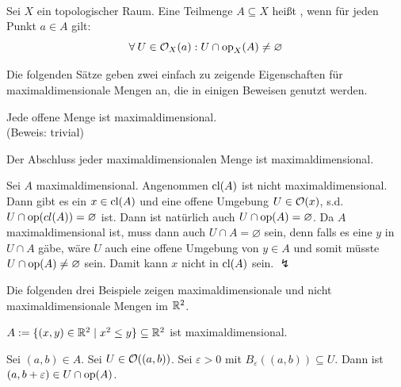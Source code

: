     \begin{dfn}[Maximaldimensional]\label{def:maxdim}\ \\
        Sei $X$ ein topologischer Raum. Eine Teilmenge $A \subseteq X$ heißt , wenn für jeden Punkt $a \in A$ gilt:
        $$\forall\: U \in \mathcal{O}_X(a) : U \cap \text{op}_X(A) \neq \varnothing$$ 
    \end{dfn}
    
    
    Die folgenden Sätze geben zwei einfach zu zeigende Eigenschaften für maximaldimensionale Mengen an, die in einigen Beweisen genutzt werden.
    \begin{satz}\label{satz:offen-maxdim}
        Jede offene Menge ist maximaldimensional.\\
        (Beweis: trivial)
    \end{satz}
    
    
    \begin{satz}\label{satz:abschluss-maxdim}
        Der Abschluss jeder maximaldimensionalen Menge ist maximaldimensional.
    \end{satz}
    
    \begin{bew}
        Sei $A$ maximaldimensional. 
        Angenommen $\text{cl}(A)$ ist nicht maximaldimensional.
        Dann gibt es ein $x \in \text{cl}(A)$ und eine offene Umgebung $U \in \mathcal{O}(x)$, s.d. $U \cap \text{op}(cl(A)) = \varnothing$ ist.
        Dann ist natürlich auch $U \cap \text{op}(A) = \varnothing$.
        Da $A$ maximaldimensional ist, muss dann auch $U \cap A = \varnothing$ sein, denn falls es eine $y$ in $U \cap A$ gäbe, wäre $U$ auch eine offene Umgebung von $y \in A$ und somit müsste $U \cap \text{op}(A) \neq \varnothing$ sein.
        Damit kann $x$ nicht in $\text{cl}(A)$ sein. 
        $\lightning$
    \end{bew}


    Die folgenden drei Beispiele zeigen maximaldimensionale und nicht maximaldimensionale Mengen im $\mathbb{R}^2$.
    \begin{bsp}\label{bsp:maximaldimensional-1}
        $A := \{(x,y) \in \mathbb{R}^2 \mid x^2 \leq y\} \subseteq \mathbb{R}^2$ ist maximaldimensional.
    \end{bsp}
    \begin{bew}
        Sei $(a,b) \in A$. Sei $U \in \mathcal{O}((a,b))$. Sei $\varepsilon > 0$ mit $B_\varepsilon((a,b)) \subseteq U$. Dann ist $(a,b+\varepsilon) \in U \cap \text{op}(A)$.
    \end{bew}


